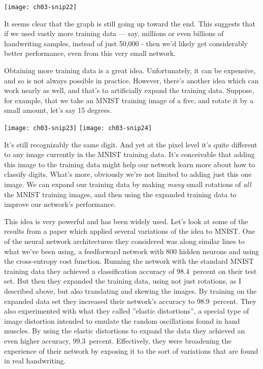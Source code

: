 \begin{marginfigure}
\texttt{[image: ch03-snip22]}
\end{marginfigure}

It seems clear that the graph is still going up toward the end. This suggests that if we used vastly more training data --- say, millions or even billions of handwriting samples, instead of just 50,000 - then we'd likely get considerably better performance, even from this very small network.

Obtaining more training data is a great idea. Unfortunately, it can be expensive, and so is not always possible in practice. However, there's another idea which can work nearly as well, and that's to artificially expand the training data. Suppose, for example, that we take an MNIST training image of a five, and rotate it by a small amount, let's say 15 degrees.
\begin{marginfigure}
    \texttt{[image: ch03-snip23]}
    \texttt{[image: ch03-snip24]}
    \end{marginfigure}
It's still recognizably the same digit. And yet at the pixel level it's quite different to any image currently in the MNIST training data. It's conceivable that adding this image to the training data might help our network learn more about how to classify digits. What's more, obviously we're not limited to adding just this one image. We can expand our training data by making \textit{many} small rotations of \textit{all} the MNIST training images, and then using the expanded training data to improve our network's performance.

This idea is very powerful and has been widely used. Let's look at some of the results from a paper
\cite{Simard2003} which applied several variations of the idea to MNIST. One of the neural network architectures they considered was along similar lines to what we've been using, a feedforward network with 800 hidden neurons and using the cross-entropy cost function. Running the network with the standard MNIST training data they achieved a classification accuracy of 98.4~percent on their test set. But then they expanded the training data, using not just rotations, as I described above, but also translating and skewing the images. By training on the expanded data set they increased their network's accuracy to 98.9~percent. They also experimented with what they called ''elastic distortions'', a special type of image distortion intended to emulate the random oscillations found in hand muscles. By using the elastic distortions to expand the data they achieved an even higher accuracy, 99.3~percent. Effectively, they were broadening the experience of their network by exposing it to the sort of variations that are found in real handwriting.


